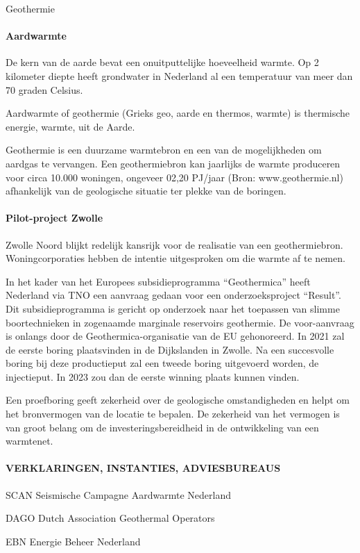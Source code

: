 \begin{voorstel}{Geothermie}
\begin{overwegingen}
\paragraph{Aardwarmte}
De kern van de aarde bevat een onuitputtelijke hoeveelheid warmte. Op 2  kilometer diepte heeft grondwater in Nederland al een temperatuur van meer dan 70 graden Celsius.

Aardwarmte of geothermie (Grieks geo, aarde en thermos, warmte) is thermische energie, warmte, uit de Aarde.

Geothermie is een duurzame warmtebron en een van de mogelijkheden om aardgas te vervangen. Een geothermiebron kan jaarlijks de warmte produceren voor circa 10.000 woningen, ongeveer 02,20 PJ/jaar (Bron: www.geothermie.nl) afhankelijk van de geologische situatie ter plekke van de boringen.

\paragraph{Pilot-project Zwolle}
Zwolle Noord blijkt redelijk kansrijk voor de realisatie van een geothermiebron. Woningcorporaties hebben de intentie uitgesproken om die warmte af te nemen.

In het kader van het Europees subsidieprogramma “Geothermica” heeft Nederland via TNO een aanvraag gedaan voor een onderzoeksproject “Result”. Dit subsidieprogramma is gericht op onderzoek naar het toepassen van slimme boortechnieken in zogenaamde marginale reservoirs geothermie. De voor-aanvraag is onlangs door de Geothermica-organisatie van de EU gehonoreerd. In 2021 zal de eerste boring plaatsvinden in de Dijkslanden in Zwolle. Na een succesvolle boring bij deze productieput zal een tweede boring uitgevoerd worden, de injectieput. In 2023 zou dan de eerste winning plaats kunnen vinden.

Een proefboring geeft zekerheid over de geologische omstandigheden en helpt om het bronvermogen van de locatie te bepalen. De zekerheid van het vermogen is van groot belang om de investeringsbereidheid in de ontwikkeling van een warmtenet.

\paragraph{VERKLARINGEN, INSTANTIES, ADVIESBUREAUS}
SCAN    Seismische Campagne Aardwarmte Nederland

DAGO    Dutch Association Geothermal Operators

EBN    Energie Beheer Nederland


\end{overwegingen}
\end{voorstel}
